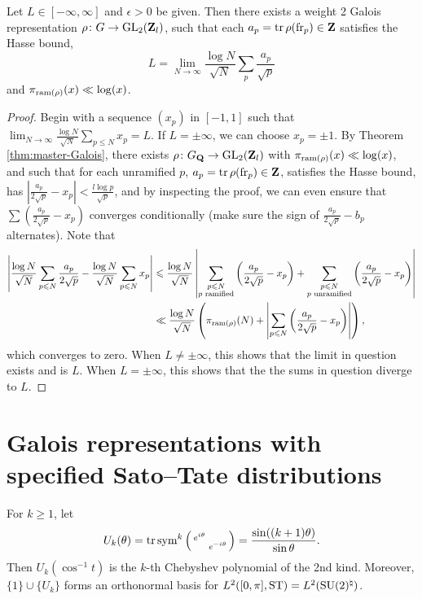 \begin{corollary}
Let $L \in [-\infty,\infty]$ and $\epsilon>0$ be given. Then there exists a 
weight 2 Galois representation $\rho\colon G\to \operatorname{GL}_2(\mathbf{Z}_l)$, such that 
each $a_p = \operatorname{tr}\rho(\mathrm{fr}_p)\in \mathbf{Z}$ satisfies the Hasse bound, 
\[
	L = \lim_{N\to \infty} \frac{\log N}{\sqrt N}\sum_p \frac{a_p}{\sqrt p} 
\]
and $\pi_{\mathrm{ram}(\rho)}(x) \ll \log(x)$. 
\end{corollary}
\begin{proof}
Begin with a sequence $(x_p)$ in $[-1,1]$ such that 
$\lim_{N\to \infty} \frac{\log N}{\sqrt N}\sum_{p\leqslant N} x_p = L$. If 
$L=\pm \infty$, we can choose $x_p = \pm 1$. By Theorem 
\ref{thm:master-Galois}, there exists $\rho\colon G_{\mathbf{Q}} \to \operatorname{GL}_2(\mathbf{Z}_l)$ with 
$\pi_{\mathrm{ram}(\rho)}(x) \ll \log(x)$, and such that for each unramified $p$, 
$a_p = \operatorname{tr}\rho(\mathrm{fr}_p)\in \mathbf{Z}$, satisfies the Hasse bound, has 
$\left| \frac{a_p}{2\sqrt p} - x_p\right| < \frac{l \log p}{\sqrt p}$, and by 
inspecting the proof, we can even ensure that 
$\sum \left(\frac{a_p}{2\sqrt p} - x_p\right)$ converges conditionally (make 
sure the sign of $\frac{a_p}{2\sqrt p} - b_p$ alternates). Note that
\begin{align*}
	\left|\frac{\log N}{\sqrt N}\sum_{p\leqslant N} \frac{a_p}{2\sqrt p} - \frac{\log N}{\sqrt N} \sum_{p\leqslant N} x_p\right| 
		&\leqslant \frac{\log N}{\sqrt N}\left|\sum_{\substack{p\leqslant N \\ p\text{ ramified}}} \left(\frac{a_p}{2 \sqrt p} - x_p\right) + \sum_{\substack{p\leqslant N \\ p\text{ unramified}}} \left(\frac{a_p}{2 \sqrt p} - x_p\right) \right|  \\
		&\ll \frac{\log N}{\sqrt N} \left(\pi_{\mathrm{ram}(\rho)}(N) + \left|\sum_{p\leqslant N} \left(\frac{a_p}{2 \sqrt p} - x_p\right)\right|\right) ,
\end{align*}
which converges to zero. 
When $L\ne \pm\infty$, this shows that the limit in question exists and is $L$. 
When $L=\pm \infty$, this shows that the the sums in question diverge to $L$. 
\end{proof}





\section{Galois representations with specified Sato--Tate distributions}

For $k\geqslant 1$, let 
\[
	U_k(\theta) = \operatorname{tr}\operatorname{sym}^k\left(\begin{smallmatrix} e^{i\theta} &  \\  & e^{- i \theta} \end{smallmatrix}\right) = \frac{\sin((k+1)\theta)}{\sin\theta} .
\]
Then $U_k(\cos^{-1} t)$ is the $k$-th Chebyshev polynomial of the 2nd kind. 
Moreover, $\{1\}\cup\{U_k\}$ forms an orthonormal basis for 
$L^2([0,\pi],\mathrm{ST}) = L^2(\operatorname{SU}(2)^\natural)$. 

